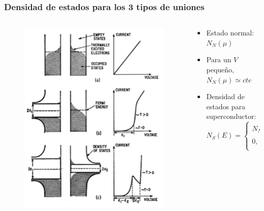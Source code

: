\begin{frame}
\frametitle{Densidad de estados para los 3 tipos de uniones}

\begin{columns}
\begin{column}{0.4\textwidth}
	\begin{figure}[!h] \label{fermi_levels}
	\includegraphics[width=\textwidth]{fermi_levels}
	\end{figure}
\end{column}
\begin{column}{0.6\textwidth}
	\begin{itemize}[<+->]
	\item{Estado normal: $N_N(\mu)$}
	\item{Para un $V$ peque\~no, $N_N(\mu)\simeq cte$}
	\item{Densidad de estados para superconductor:
		\begin{equation*}\label{ns}
		N_S(E) = 
		\left\{ 
		\begin{array}{ll} 
		N_N(\epsilon)\frac{|E|}{\sqrt{E^2-\Delta^2}},	&	|E| > \Delta 	\\ 
		0,								& 	|E| \leq \Delta	\\
		\end{array}
		\right.
		\end{equation*}
		}
	\end{itemize}
\end{column}
\end{columns}


\end{frame}
